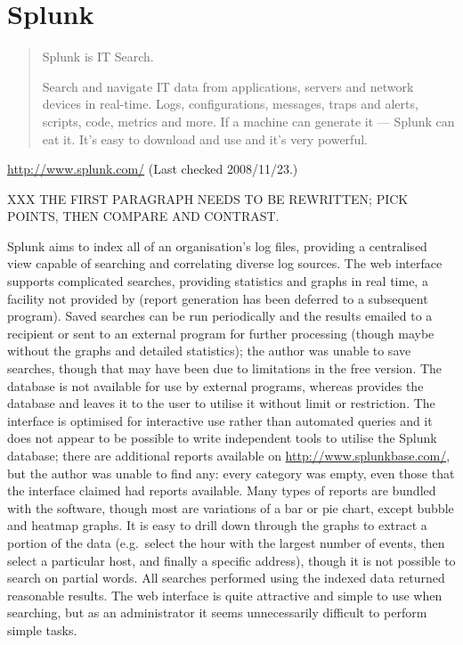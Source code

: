 \section{Splunk}

\begin{quotation}

    Splunk is IT Search.

    Search and navigate IT data from applications, servers and network
    devices in real-time. Logs, configurations, messages, traps and alerts,
    scripts, code, metrics and more. If a machine can generate it ---
    Splunk can eat it. It's easy to download and use and it's very
    powerful.

\end{quotation}

\noindent{}\url{http://www.splunk.com/} \newline{}
(Last checked 2008/11/23.)

XXX THE FIRST PARAGRAPH NEEDS TO BE REWRITTEN\@; PICK POINTS, THEN COMPARE
AND CONTRAST\@.

Splunk aims to index all of an organisation's log files, providing a
centralised view capable of searching and correlating diverse log sources.
The web interface supports complicated searches, providing statistics and
graphs in real time, a facility not provided by \parsername{} (report
generation has been deferred to a subsequent program).  Saved searches can
be run periodically and the results emailed to a recipient or sent to an
external program for further processing (though maybe without the graphs
and detailed statistics); the author was unable to save searches, though
that may have been due to limitations in the free version.  The database is
not available for use by external programs, whereas \parsername{} provides
the database and leaves it to the user to utilise it without limit or
restriction.  The interface is optimised for interactive use rather than
automated queries and it does not appear to be possible to write
independent tools to utilise the Splunk database; there are additional
reports available on \url{http://www.splunkbase.com/}, but the author was
unable to find any: every category was empty, even those that the interface
claimed had reports available.  Many types of reports are bundled with the
software, though most are variations of a bar or pie chart, except bubble
and heatmap graphs.  It is easy to drill down through the graphs to extract
a portion of the data (e.g.\ select the hour with the largest number of
events, then select a particular host, and finally a specific address),
though it is not possible to search on partial words.  All searches
performed using the indexed data returned reasonable results.  The web
interface is quite attractive and simple to use when searching, but as an
administrator it seems unnecessarily difficult to perform simple tasks.


